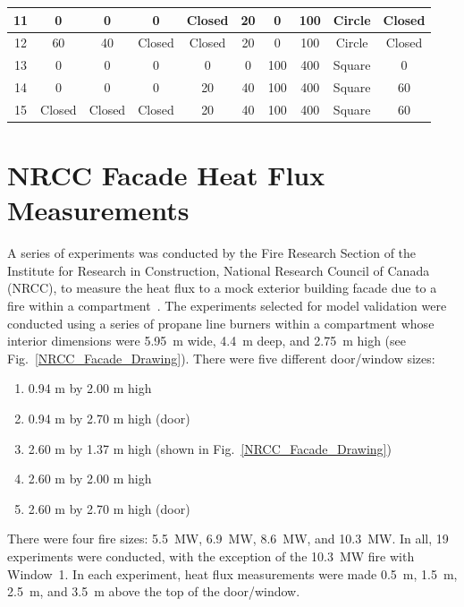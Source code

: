 \begin{table}[h!]
\begin{center}
\begin{tabular}{|c|c|c|c|c|c|c|c|c|c|}
11   &  0       &  0      &  0        &  Closed  &  20     &  0           &  100         & Circle  & Closed  \\ \hline
12   &  60      &  40     &  Closed   &  Closed  &  20     &  0           &  100         & Circle  & Closed  \\ \hline
13   &  0       &  0      &  0        &  0       &  0      &  100         &  400         &  Square & 0       \\ \hline
14   &  0       &  0      &  0        &  20      &  40     &  100         &  400         &  Square & 60      \\ \hline
15   &  Closed  & Closed  &  Closed   &  20      &  40     &  100         &  400         &  Square & 60      \\ \hline
\end{tabular}
\end{center}
\label{tab:NIST_Vent_Study}
\end{table}


\FloatBarrier

\section{NRCC Facade Heat Flux Measurements}
\label{NRCC_Facade_Description}

A series of experiments was conducted by the Fire Research Section of the Institute for Research in Construction, National Research Council of Canada (NRCC), to measure the heat flux to a mock exterior building facade due to a fire within a compartment~\cite{Oleszkiewicz:ASME,Oleszkiewicz:FireTech}. The experiments selected for model validation were conducted using a series of propane line burners within a compartment whose interior dimensions were 5.95~m wide, 4.4~m deep, and 2.75~m high (see Fig.~\ref{NRCC_Facade_Drawing}). There were five different door/window sizes:
\begin{enumerate}
\item 0.94 m by 2.00 m high
\item 0.94 m by 2.70 m high (door)
\item 2.60 m by 1.37 m high (shown in Fig.~\ref{NRCC_Facade_Drawing})
\item 2.60 m by 2.00 m high
\item 2.60 m by 2.70 m high (door)
\end{enumerate}
There were four fire sizes: 5.5~MW, 6.9~MW, 8.6~MW, and 10.3~MW. In all, 19 experiments were conducted, with the exception of the 10.3~MW fire with Window~1. In each experiment, heat flux measurements were made 0.5~m, 1.5~m, 2.5~m, and 3.5~m above the top of the door/window.

